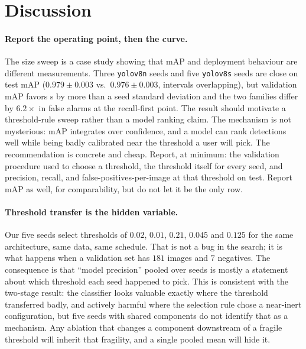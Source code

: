 \section{Discussion}
\label{sec:discussion}

\paragraph{Report the operating point, then the curve.} The size sweep is a
case study showing that mAP and deployment behaviour are different measurements.
Three \texttt{yolov8n} seeds and five \texttt{yolov8s} seeds are close on test
mAP ($0.979 \pm 0.003$ vs.\ $0.976 \pm 0.003$, intervals overlapping), but
validation mAP favors s by more than a seed standard deviation and the two
families differ by $6.2\times$ in false alarms at the recall-first point. The
result should motivate a threshold-rule sweep rather than a model ranking claim.
The mechanism is not mysterious: mAP integrates over confidence, and a model can
rank detections well while being badly calibrated near the threshold a user will
pick. The recommendation is concrete and cheap. Report, at minimum: the
validation procedure used to choose a threshold, the threshold itself for every
seed, and precision, recall, and false-positives-per-image at that threshold on
test. Report mAP as well, for comparability, but do not let it be the only row.

\paragraph{Threshold transfer is the hidden variable.} Our five seeds select
thresholds of $0.02$, $0.01$, $0.21$, $0.045$ and $0.125$ for the same
architecture, same data, same schedule. That is not a bug in the search; it is
what happens when a validation set has $181$ images and $7$ negatives. The
consequence is that ``model precision'' pooled over seeds is mostly a statement
about which threshold each seed happened to pick. This is consistent with the
two-stage result: the classifier looks valuable exactly where the threshold
transferred badly, and actively harmful where the selection rule chose a
near-inert configuration, but five seeds with shared components do not identify
that as a mechanism. Any ablation that changes a component downstream of a fragile
threshold will inherit that fragility, and a single pooled mean will hide it.

